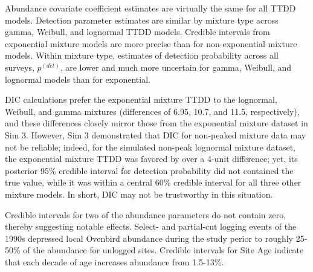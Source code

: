 \documentclass[useAMS,usenatbib,referee,12pt]{article}
\begin{document}
Abundance covariate coefficient estimates are virtually the same for all TTDD models.  Detection parameter estimates are similar by mixture type across gamma, Weibull, and lognormal TTDD models.  Credible intervals from exponential mixture models are more precise than for non-exponential mixture models.  Within mixture type, estimates of detection probability across all surveys, $p^{(det)}$, are lower and much more uncertain for gamma, Weibull, and lognormal models than for exponential.

DIC calculations prefer the exponential mixture TTDD to the lognormal, Weibull, and gamma mixtures (differences of 6.95, 10.7, and 11.5, respectively), and these differences closely mirror those from the exponential mixture dataset in Sim 3.  However, Sim 3 demonstrated that DIC for non-peaked mixture data may not be reliable; indeed, for the simulated non-peak lognormal mixture dataset, the exponential mixture TTDD was favored by over a 4-unit difference; yet, its posterior 95\% credible interval for detection probability did not contained the true value, while it was within a central 60\% credible interval for all three other mixture models.  In short, DIC may not be trustworthy in this situation.

Credible intervals for two of the abundance parameters do not contain zero, thereby suggesting notable effects.  Select- and partial-cut logging events of the 1990s depressed local Ovenbird abundance during the study perior to roughly 25-50\% of the abundance for unlogged sites.  Credible intervals for Site Age indicate that each decade of age increases abundance from 1.5-13\%.
\end{document}
